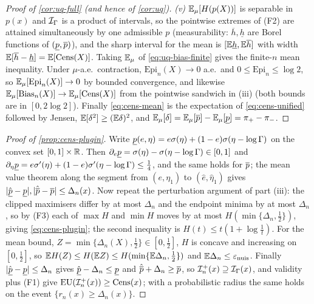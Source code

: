 \begin{proof}[Proof of \cref{cor:uq-full} (and hence of \cref{cor:uq})]
\emph{(v)} $\mathbb{E}_\mu[H(p(X))]$ is separable in $p(x)$ and $\mathcal{I}_\Gamma$ is a product of
intervals, so the pointwise extremes of (F2) are attained simultaneously by one admissible
$p$ (measurability: $\overline h,\underline h$ are Borel functions of $(\underline{p},\overline{p})$), and the
sharp interval for the mean is $[\mathbb{E}\underline h,\mathbb{E}\overline h]$ with width
$\mathbb{E}[\overline h-\underline h]=\mathbb{E}[\mathrm{Cens}(X)]$. Taking $\mathbb{E}_\mu$ of
\eqref{eq:uq-bias-finite} gives the finite-$n$ mean inequality. Under $\mu$-a.e.\
contraction, $\mathrm{Epi}_n(X)\to0$ a.e.\ and $0\le\mathrm{Epi}_n\le\log2$, so
$\mathbb{E}_\mu[\mathrm{Epi}_n(X)]\to0$ by bounded convergence, and likewise
$\mathbb{E}_\mu[\mathrm{Bias}_n(X)]\to\mathbb{E}_\mu[\mathrm{Cens}(X)]$ from the pointwise sandwich in (iii)
(both bounds are in $[0,2\log2]$). Finally \eqref{eq:cens-mean} is the expectation of
\eqref{eq:cens-unified} followed by Jensen, $\mathbb{E}[\delta^2]\ge(\mathbb{E}\delta)^2$, and
$\mathbb{E}_\mu[\delta]=\mathbb{E}_\mu[\overline{p}]-\mathbb{E}_\mu[\underline{p}]=\pi_+-\pi_-$.
\end{proof}

\begin{proof}[Proof of \cref{prop:cens-plugin}]
Write $\underline{p}(e,\eta)=e\sigma(\eta)+(1-e)\sigma(\eta-\log\Gamma)$ on the convex set
$[0,1]\times\mathbb{R}$. Then $\partial_e\underline{p}=\sigma(\eta)-\sigma(\eta-\log\Gamma)\in[0,1]$ and
$\partial_\eta\underline{p}=e\sigma'(\eta)+(1-e)\sigma'(\eta-\log\Gamma)\le\tfrac14$, and the same
holds for $\overline{p}$; the mean value theorem along the segment from $(e,\eta_1)$ to
$(\hat e,\hat\eta_1)$ gives $|\hat{\underline{p}}-\underline{p}|,|\hat{\overline{p}}-\overline{p}|\le\Delta_n(x)$. Now repeat the
perturbation argument of part (iii): the clipped maximisers differ by at most
$\Delta_n$ and the endpoint minima by at most $\Delta_n$, so by (F3) each of
$\max H$ and $\min H$ moves by at most $H(\min\{\Delta_n,\tfrac12\})$, giving
\eqref{eq:cens-plugin}; the second inequality is $H(t)\le t(1+\log\tfrac1t)$. For the mean
bound, $Z=\min\{\Delta_n(X),\tfrac12\}\in[0,\tfrac12]$, $H$ is concave and increasing on
$[0,\tfrac12]$, so $\mathbb{E} H(Z)\le H(\mathbb{E} Z)\le H(\min\{\mathbb{E}\Delta_n,\tfrac12\})$ and
$\mathbb{E}\Delta_n\le\varepsilon_{\mathrm{nuis}}$. Finally $|\hat{\underline{p}}-\underline{p}|\le\Delta_n$ gives
$\hat{\underline{p}}-\Delta_n\le\underline{p}$ and $\hat{\overline{p}}+\Delta_n\ge\overline{p}$, so
$\mathcal{I}^{+}_n(x)\supseteq\mathcal{I}_\Gamma(x)$, and validity plus (F1) give
$\mathrm{EU}(\mathcal{I}^{+}_n(x))\ge\mathrm{Cens}(x)$; with a probabilistic radius the same holds on
the event $\{r_n(x)\ge\Delta_n(x)\}$.
\end{proof}
